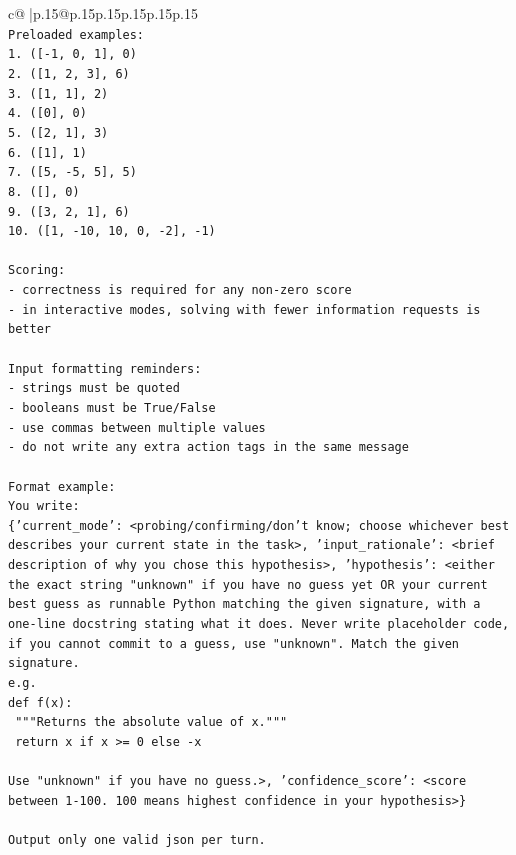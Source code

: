 \documentclass{article}
\begin{document}
{\begin{supertabular}{c@{$\;$}|p{.15\linewidth}@{}p{.15\linewidth}p{.15\linewidth}p{.15\linewidth}p{.15\linewidth}p{.15\linewidth}}
{{{\\ 
\texttt{Preloaded examples:} \\
\texttt{1. ({[}{-}1, 0, 1{]}, 0)} \\
\texttt{2. ({[}1, 2, 3{]}, 6)} \\
\texttt{3. ({[}1, 1{]}, 2)} \\
\texttt{4. ({[}0{]}, 0)} \\
\texttt{5. ({[}2, 1{]}, 3)} \\
\texttt{6. ({[}1{]}, 1)} \\
\texttt{7. ({[}5, {-}5, 5{]}, 5)} \\
\texttt{8. ({[}{]}, 0)} \\
\texttt{9. ({[}3, 2, 1{]}, 6)} \\
\texttt{10. ({[}1, {-}10, 10, 0, {-}2{]}, {-}1)} \\
\\ 
\texttt{Scoring:} \\
\texttt{{-} correctness is required for any non{-}zero score} \\
\texttt{{-} in interactive modes, solving with fewer information requests is better} \\
\\ 
\texttt{Input formatting reminders:} \\
\texttt{{-} strings must be quoted} \\
\texttt{{-} booleans must be True/False} \\
\texttt{{-} use commas between multiple values} \\
\texttt{{-} do not write any extra action tags in the same message} \\
\\ 
\texttt{Format example:} \\
\texttt{You write:} \\
\texttt{\{'current\_mode': <probing/confirming/don't know; choose whichever best describes your current state in the task>, 'input\_rationale': <brief description of why you chose this hypothesis>, 'hypothesis': <either the exact string "unknown" if you have no guess yet OR your current best guess as runnable Python matching the given signature, with a one{-}line docstring stating what it does. Never write placeholder code, if you cannot commit to a guess, use "unknown". Match the given signature.} \\
\texttt{e.g.} \\
\texttt{def f(x):} \\
\texttt{	"""Returns the absolute value of x."""} \\
\texttt{	return x if x >= 0 else {-}x} \\
\\ 
\texttt{Use "unknown" if you have no guess.>, 'confidence\_score': <score between 1{-}100. 100 means highest confidence in your hypothesis>\}} \\
\\ 
\texttt{Output only one valid json per turn.} \\
            }
        }
    }
     \\ \\


\end{supertabular}}
\end{document}
